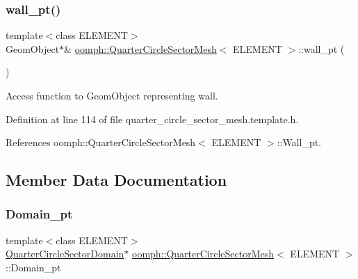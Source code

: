 \mbox{\label{classoomph_1_1QuarterCircleSectorMesh_a0b03071bbe7e95cc6723c221ddc0998a}} 
\subsubsection{\texorpdfstring{wall\+\_\+pt()}{wall\_pt()}}
{\footnotesize\ttfamily template$<$class E\+L\+E\+M\+E\+NT$>$ \\
Geom\+Object$\ast$\& \hyperlink{classoomph_1_1QuarterCircleSectorMesh}{oomph\+::\+Quarter\+Circle\+Sector\+Mesh}$<$ E\+L\+E\+M\+E\+NT $>$\+::wall\+\_\+pt (\begin{DoxyParamCaption}{ }\end{DoxyParamCaption})\hspace{0.3cm}{\ttfamily [inline]}}



Access function to Geom\+Object representing wall. 



Definition at line 114 of file quarter\+\_\+circle\+\_\+sector\+\_\+mesh.\+template.\+h.



References oomph\+::\+Quarter\+Circle\+Sector\+Mesh$<$ E\+L\+E\+M\+E\+N\+T $>$\+::\+Wall\+\_\+pt.



\subsection{Member Data Documentation}
\mbox{\label{classoomph_1_1QuarterCircleSectorMesh_a49e72c17a9409ec4a2b7a1ebf98fb4a1}} 
\subsubsection{\texorpdfstring{Domain\+\_\+pt}{Domain\_pt}}
{\footnotesize\ttfamily template$<$class E\+L\+E\+M\+E\+NT$>$ \\
\hyperlink{classoomph_1_1QuarterCircleSectorDomain}{Quarter\+Circle\+Sector\+Domain}$\ast$ \hyperlink{classoomph_1_1QuarterCircleSectorMesh}{oomph\+::\+Quarter\+Circle\+Sector\+Mesh}$<$ E\+L\+E\+M\+E\+NT $>$\+::Domain\+\_\+pt\hspace{0.3cm}{\ttfamily [protected]}}



